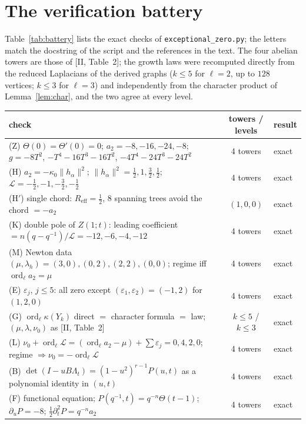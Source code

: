 \documentclass[11pt]{amsart}
\numberwithin{equation}{section}
\theoremstyle{definition}
\theoremstyle{remark}
\newcommand{\La}{\Lambda}
\newcommand{\cL}{\mathcal{L}}
\newcommand{\ord}{\operatorname{ord}}
\newcommand{\Reff}{R_{\mathrm{eff}}}
\begin{document}
\section{The verification battery}\label{sec:battery}

Table~\ref{tab:battery} lists the exact checks of \texttt{exceptional\_zero.py}; the
letters match the docstring of the script and the references in the text. The four
abelian towers are those of [II, Table~2]; the growth laws were recomputed directly
from the reduced Laplacians of the derived graphs ($k\le5$ for $\ell=2$, up to $128$
vertices; $k\le3$ for $\ell=3$) and independently from the character product of
Lemma~\ref{lem:char}, and the two agree at every level.

\begin{table}[ht]
\centering\scriptsize
\renewcommand{\arraystretch}{1.2}
\begin{tabular}{p{11.3cm}cl}
\toprule
check & towers / levels & result\\
\midrule
(Z) $\Theta(0)=\Theta'(0)=0$; $a_2=-8,-16,-24,-8$; $g=-8T^{2}$, $-T^{4}-16T^{3}-16T^{2}$, $-4T^{4}-24T^{3}-24T^{2}$ & 4 towers & exact\\
(H) $a_2=-\kappa_0\|h_\alpha\|^{2}$; $\|h_\alpha\|^{2}=\frac12,1,\frac32,\frac12$; $\cL=-\frac12,-1,-\frac32,-\frac12$ & 4 towers & exact\\
(H$'$) single chord: $\Reff=\frac12$, $8$ spanning trees avoid the chord $=-a_2$ & $(1,0,0)$ & exact\\
(K) double pole of $Z(1;t)$: leading coefficient $=n(q-q^{-1})/\cL=-12,-6,-4,-12$ & 4 towers & exact\\
(M) Newton data $(\mu,\lambda_h)=(3,0),(0,2),(2,2),(0,0)$; regime iff $\ord_\ell a_2=\mu$ & 4 towers & exact\\
(E) $\varepsilon_j$, $j\le5$: all zero except $(\varepsilon_1,\varepsilon_2)=(-1,2)$ for $(1,2,0)$ & 4 towers & exact\\
(G) $\ord_\ell\kappa(Y_k)$ direct $=$ character formula $=$ law; $(\mu,\lambda,\nu_0)$ as [II, Table~2] & $k\le5$ / $k\le3$ & exact\\
(L) $\nu_0+\ord_\ell\cL=(\ord_\ell a_2-\mu)+\sum\varepsilon_j=0,4,2,0$; regime $\Rightarrow\nu_0=-\ord_\ell\cL$ & 4 towers & exact\\
(B) $\det(I-uB\La_t)=(1-u^{2})^{r-1}P(u,t)$ as a polynomial identity in $(u,t)$ & 4 towers & exact\\
(F) functional equation; $P(q^{-1},t)=q^{-n}\Theta(t-1)$; $\partial_uP=-8$; $\frac12\partial_t^{2}P=q^{-n}a_2$ & 4 towers & exact\\

\end{tabular}
\end{table}
\end{document}
